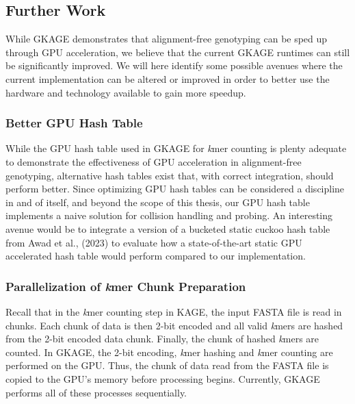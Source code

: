 \subsection{Further Work}
While GKAGE demonstrates that alignment-free genotyping can be sped up through GPU acceleration, we believe that the current GKAGE runtimes can still be significantly improved.
We will here identify some possible avenues where the current implementation can be altered or improved in order to better use the hardware and technology available to gain more speedup.

\subsubsection{Better GPU Hash Table}
While the GPU hash table used in GKAGE for \textit{k}mer counting is plenty adequate to demonstrate the effectiveness of GPU acceleration in alignment-free genotyping, alternative hash tables exist that, with correct integration, should perform better.
Since optimizing GPU hash tables can be considered a discipline in and of itself, and beyond the scope of this thesis, our GPU hash table implements a naive solution for collision handling and probing.
An interesting avenue would be to integrate a version of a bucketed static cuckoo hash table from Awad et al., (2023) \cite{bght} to evaluate how a state-of-the-art static GPU accelerated hash table would perform compared to our implementation.

\subsubsection{Parallelization of \textit{k}mer Chunk Preparation}
Recall that in the \textit{k}mer counting step in KAGE, the input FASTA file is read in chunks.
Each chunk of data is then 2-bit encoded and all valid \textit{k}mers are hashed from the 2-bit encoded data chunk.
Finally, the chunk of hashed \textit{k}mers are counted.
In GKAGE, the 2-bit encoding, \textit{k}mer hashing and \textit{k}mer counting are performed on the GPU.
Thus, the chunk of data read from the FASTA file is copied to the GPU's memory before processing begins.
Currently, GKAGE performs all of these processes sequentially.

